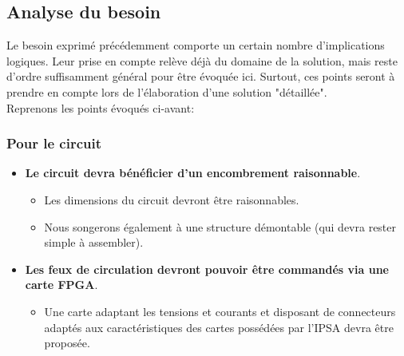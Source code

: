 \subsection{Analyse du besoin}

Le besoin exprimé précédemment comporte un certain nombre d'implications logiques.
Leur prise en compte relève déjà du domaine de la solution, mais reste d'ordre suffisamment général pour être évoquée ici. Surtout, ces points seront à prendre en compte lors de l'élaboration d'une solution "détaillée".\\

Reprenons les points évoqués ci-avant:

\renewcommand{\labelitemi}{\textbullet}
\renewcommand{\labelitemii}{$\Rightarrow$}
\renewcommand{\labelitemiii}{-}
\renewcommand{\labelitemiv}{\textbullet}

	\subsubsection{Pour le circuit}
		\begin{itemize}
			\item \textbf{Le circuit devra bénéficier d'un encombrement raisonnable}.
			\begin{itemize}
				\item Les dimensions du circuit devront être raisonnables.
				\item Nous songerons également à une structure démontable (qui devra rester simple à assembler).
			\end{itemize}
			\item \textbf{Les feux de circulation devront pouvoir être commandés via une carte FPGA}.
			\begin{itemize}
				\item Une carte adaptant les tensions et courants et disposant de connecteurs adaptés aux caractéristiques des cartes possédées par l'IPSA devra être proposée.
			\end{itemize}
		\end{itemize}
